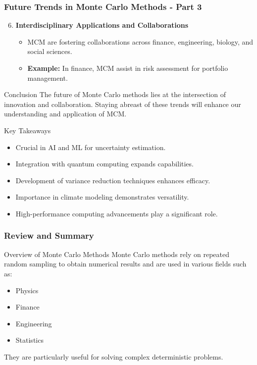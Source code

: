 \documentclass[aspectratio=169]{beamer}
\begin{document}
\begin{frame}[fragile]
    \frametitle{Future Trends in Monte Carlo Methods - Part 3}
    \begin{enumerate}
        \setcounter{enumi}{5}
        \item \textbf{Interdisciplinary Applications and Collaborations}
            \begin{itemize}
                \item MCM are fostering collaborations across finance, engineering, biology, and social sciences.
                \item \textbf{Example:} In finance, MCM assist in risk assessment for portfolio management.
            \end{itemize}
    \end{enumerate}
    
    \begin{block}{Conclusion}
        The future of Monte Carlo methods lies at the intersection of innovation and collaboration. Staying abreast of these trends will enhance our understanding and application of MCM.
    \end{block}

    \begin{block}{Key Takeaways}
        \begin{itemize}
            \item Crucial in AI and ML for uncertainty estimation.
            \item Integration with quantum computing expands capabilities.
            \item Development of variance reduction techniques enhances efficacy.
            \item Importance in climate modeling demonstrates versatility.
            \item High-performance computing advancements play a significant role.
        \end{itemize}
    \end{block}
\end{frame}

\begin{frame}[fragile]
    \frametitle{Review and Summary}
    \begin{block}{Overview of Monte Carlo Methods}
        Monte Carlo methods rely on repeated random sampling to obtain numerical results and are used in various fields such as:
        \begin{itemize}
            \item Physics
            \item Finance
            \item Engineering
            \item Statistics
        \end{itemize}
        They are particularly useful for solving complex deterministic problems.
    \end{block}
\end{frame}
\end{document}
